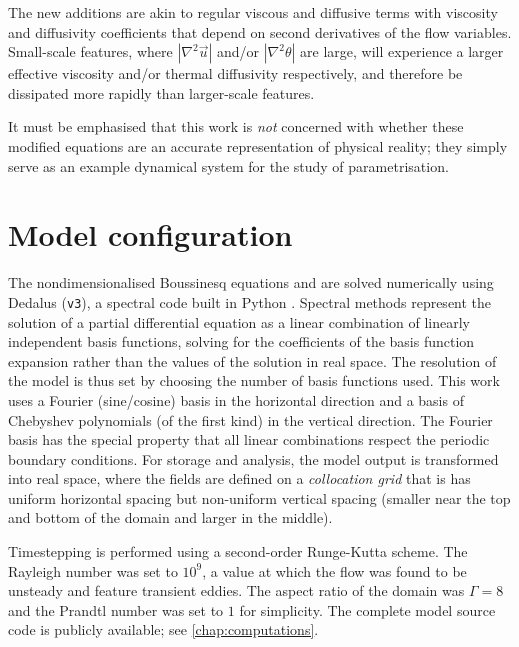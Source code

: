 \documentclass[../main.tex]{subfiles}
\begin{document}
The new additions are akin to regular viscous and diffusive terms with
viscosity and diffusivity coefficients that depend on second derivatives of the
flow variables. Small-scale features, where $|\nabla^2 \vec{u}|$ and/or
$|\nabla^2 \theta|$ are large, will experience a larger effective viscosity
and/or thermal diffusivity respectively, and therefore be dissipated more
rapidly than larger-scale features.

It must be emphasised that this work is \emph{not} concerned with whether these
modified equations are an accurate representation of physical reality; they
simply serve as an example dynamical system for the study of parametrisation.


\section{Model configuration}
\label{sec:config}
The nondimensionalised Boussinesq equations
 and
 are solved numerically using Dedalus
(\texttt{v3}), a spectral code built in Python \parencite{burns2020}. Spectral
methods represent the solution of a partial differential equation as a linear
combination of linearly independent basis functions, solving for the
coefficients of the basis function expansion rather than the values of the
solution in real space. The resolution of the model is thus set by choosing the
number of basis functions used. This work uses a Fourier (sine/cosine) basis in
the horizontal direction and a basis of Chebyshev polynomials (of the first
kind) in the vertical direction. The Fourier basis has the special property
that all linear combinations respect the periodic boundary conditions.
For storage and analysis, the model output is transformed into real space,
where the fields are defined on a \emph{collocation grid} that is has uniform
horizontal spacing but non-uniform vertical spacing (smaller near the top and
bottom of the domain and larger in the middle).

Timestepping is performed using a second-order Runge-Kutta scheme. The Rayleigh
number was set to $10^9$, a value at which the flow was found to be unsteady
and feature transient eddies. The aspect ratio of the domain was $\Gamma = 8$
and the Prandtl number was set to $1$ for simplicity. The complete model source
code is publicly available; see \cref{chap:computations}.
\end{document}

